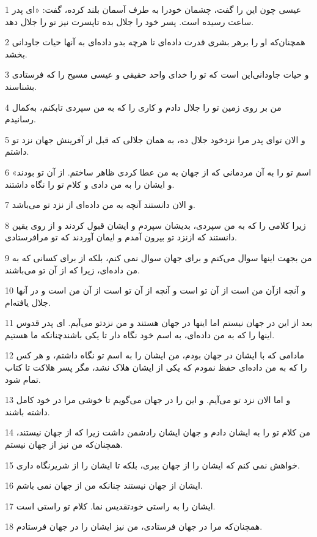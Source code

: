 \par 1 عیسی چون این را گفت، چشمان خودرا به طرف آسمان بلند کرده، گفت: «ای پدر ساعت رسیده است. پسر خود را جلال بده تاپسرت نیز تو را جلال دهد.
\par 2 همچنان‌که او را برهر بشری قدرت داده‌ای تا هر‌چه بدو داده‌ای به آنها حیات جاودانی بخشد.
\par 3 و حیات جاودانی‌این است که تو را خدای واحد حقیقی و عیسی مسیح را که فرستادی بشناسند.
\par 4 من بر روی زمین تو را جلال دادم و کاری را که به من سپردی تابکنم، به‌کمال رسانیدم.
\par 5 و الان تو‌ای پدر مرا نزدخود جلال ده، به همان جلالی که قبل از آفرینش جهان نزد تو داشتم.
\par 6 «اسم تو را به آن مردمانی که از جهان به من عطا کردی ظاهر ساختم. از آن تو بودند و ایشان را به من دادی و کلام تو را نگاه داشتند.
\par 7 و الان دانستند آنچه به من داده‌ای از نزد تو می‌باشد.
\par 8 زیرا کلامی را که به من سپردی، بدیشان سپردم و ایشان قبول کردند و از روی یقین دانستند که ازنزد تو بیرون آمدم و ایمان آوردند که تو مرافرستادی.
\par 9 من بجهت اینها سوال می‌کنم و برای جهان سوال نمی کنم، بلکه از برای کسانی که به من داده‌ای، زیرا که از آن تو می‌باشند.
\par 10 و آنچه ازآن من است از آن تو است و آنچه از آن تو است از آن من است و در آنها جلال یافته‌ام.
\par 11 بعد از این در جهان نیستم اما اینها در جهان هستند و من نزدتو می‌آیم. ای پدر قدوس اینها را که به من داده‌ای، به اسم خود نگاه دار تا یکی باشندچنانکه ما هستیم.
\par 12 مادامی که با ایشان در جهان بودم، من ایشان را به اسم تو نگاه داشتم، و هر کس را که به من داده‌ای حفظ نمودم که یکی از ایشان هلاک نشد، مگر پسر هلاکت تا کتاب تمام شود.
\par 13 و اما الان نزد تو می‌آیم. و این را در جهان می‌گویم تا خوشی مرا در خود کامل داشته باشند.
\par 14 من کلام تو را به ایشان دادم و جهان ایشان رادشمن داشت زیرا که از جهان نیستند، همچنان‌که من نیز از جهان نیستم.
\par 15 خواهش نمی کنم که ایشان را از جهان ببری، بلکه تا ایشان را از شریرنگاه داری.
\par 16 ایشان از جهان نیستند چنانکه من از جهان نمی باشم.
\par 17 ایشان را به راستی خودتقدیس نما. کلام تو راستی است.
\par 18 همچنان‌که مرا در جهان فرستادی، من نیز ایشان را در جهان فرستادم.
